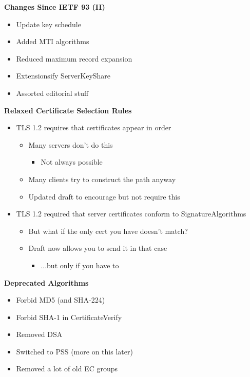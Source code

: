 \documentclass[helvetica]{seminar}
\newcommand{\heading}[1]{%
  \begin{center} 
    \large\bf 
    #1 
  \end{center} 
  \vspace{.4 in}}
\begin{document}
\begin{slide}
\heading{Changes Since IETF 93 (II)}

\begin{itemize}
\item Update key schedule
\item Added MTI algorithms
\item Reduced maximum record expansion
\item Extensionsify ServerKeyShare
\item Assorted editorial stuff
\end{itemize}
\end{slide}


\begin{slide}
\heading{Relaxed Certificate Selection Rules}

\begin{itemize}
\item TLS 1.2 requires that certificates appear in order
  \begin{itemize}
  \item Many servers don't do this
    \begin{itemize}
    \item Not always possible
    \end{itemize}
  \item Many clients try to construct the path anyway
  \item Updated draft to encourage but not require this
  \end{itemize}

\item TLS 1.2 required that server certificates conform to SignatureAlgorithms
  \begin{itemize}
  \item But what if the only cert you have doesn't match?
  \item Draft now allows you to send it in that case 
    \begin{itemize}
    \item ...but only if you have to
    \end{itemize}
  \end{itemize}
\end{itemize}
\end{slide}


\begin{slide}
\heading{Deprecated Algorithms} 

\begin{itemize}
\item Forbid MD5 (and SHA-224)
\item Forbid SHA-1 in CertificateVerify
\item Removed DSA
\item Switched to PSS (more on this later)
\item Removed a lot of old EC groups
\end{itemize}

\end{slide}
\end{document}
